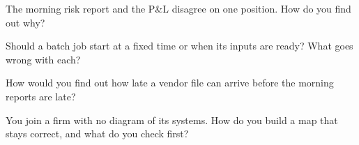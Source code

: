\begin{interviewq}\label{iq:pl:the-platform-map:3}
The morning risk report and the P\&L disagree on one position. How do you find out why?
\end{interviewq}

\begin{interviewq}\label{iq:pl:the-platform-map:4}
Should a batch job start at a fixed time or when its inputs are ready? What goes wrong with each?
\end{interviewq}

\begin{interviewq}\label{iq:pl:the-platform-map:5}
How would you find out how late a vendor file can arrive before the morning reports are late?
\end{interviewq}

\begin{interviewq}\label{iq:pl:the-platform-map:6}
You join a firm with no diagram of its systems. How do you build a map that stays correct, and what do you check first?
\end{interviewq}
